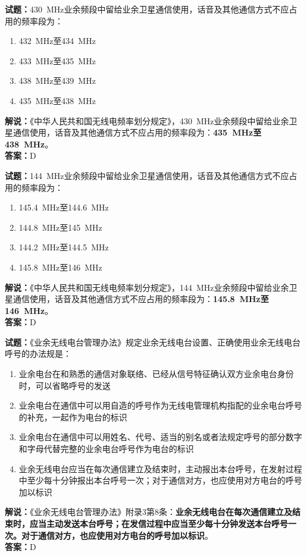 \documentclass{ctexbook}
\begin{document}
\bigskip

\noindent\textbf{试题：}\qty{430}{\MHz}业余频段中留给业余卫星通信使用，话音及其他通信方式不应占用的频率段为：
\begin{enumerate}[leftmargin=3em]
  \item \qty{432}{\MHz}至\qty{434}{\MHz}
  \item \qty{433}{\MHz}至\qty{435}{\MHz}
  \item \qty{438}{\MHz}至\qty{439}{\MHz}
  \item \qty{435}{\MHz}至\qty{438}{\MHz}
\end{enumerate}
\noindent\textbf{解说：}《中华人民共和国无线电频率划分规定》，\qty{430}{\MHz}业余频段中留给业余卫星通信使用，话音及其他通信方式不应占用的频率段为：\textbf{\qty{435}{\MHz}至\qty{438}{\MHz}}。\\\noindent\textbf{答案：}D

\bigskip

\noindent\textbf{试题：}\qty{144}{\MHz}业余频段中留给业余卫星通信使用，话音及其他通信方式不应占用的频率段为：
\begin{enumerate}[leftmargin=3em]
  \item \qty{145.4}{\MHz}至\qty{144.6}{\MHz}
  \item \qty{144.8}{\MHz}至\qty{145}{\MHz}
  \item \qty{144.2}{\MHz}至\qty{144.5}{\MHz}
  \item \qty{145.8}{\MHz}至\qty{146}{\MHz}
\end{enumerate}
\noindent\textbf{解说：}《中华人民共和国无线电频率划分规定》，\qty{144}{\MHz}业余频段中留给业余卫星通信使用，话音及其他通信方式不应占用的频率段为：\textbf{\qty{145.8}{\MHz}至\qty{146}{\MHz}}。\\\noindent\textbf{答案：}D

\bigskip

\noindent\textbf{试题：}《业余无线电台管理办法》规定业余无线电台设置、正确使用业余无线电台呼号的办法规是：
\begin{enumerate}[leftmargin=3em]
  \item 业余电台在和熟悉的通信对象联络、已经从信号特征确认双方业余电台身份时，可以省略呼号的发送
  \item 业余电台在通信中可以用自造的呼号作为无线电管理机构指配的业余电台呼号的补充，一起作为电台的标识
  \item 业余电台在通信中可以用姓名、代号、适当的别名或者法规定呼号的部分数字和字母代替完整的业余电台呼号作为电台的标识
  \item 业余无线电台应当在每次通信建立及结束时，主动报出本台呼号，在发射过程中至少每十分钟报出本台呼号一次；对于通信对方，也应使用对方电台的呼号加以标识
\end{enumerate}
\noindent\textbf{解说：}《业余无线电台管理办法》附录3第8条：\textbf{业余无线电台在每次通信建立及结束时，应当主动发送本台呼号；在发信过程中应当至少每十分钟发送本台呼号一次。对于通信对方，也应使用对方电台的呼号加以标识}。\\\noindent\textbf{答案：}D
\end{document}
